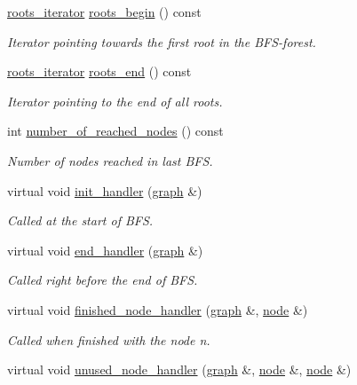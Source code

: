 \begin{DoxyCompactItemize}
\mbox{\hyperlink{classbfs_a70b915179053a2993154614d4358fdc1}{roots\+\_\+iterator}} \mbox{\hyperlink{classbfs_a45d58d06d0dcd6427edad2ec52a6ebb9}{roots\+\_\+begin}} () const
\begin{DoxyCompactList}\small\item\em Iterator pointing towards the first root in the B\+F\+S-\/forest. \end{DoxyCompactList}\item 
\mbox{\hyperlink{classbfs_a70b915179053a2993154614d4358fdc1}{roots\+\_\+iterator}} \mbox{\hyperlink{classbfs_ac84b90f777adeb90390689db62602d73}{roots\+\_\+end}} () const
\begin{DoxyCompactList}\small\item\em Iterator pointing to the end of all roots. \end{DoxyCompactList}\item 
int \mbox{\hyperlink{classbfs_abb971551139ed87e6c78062275301c1b}{number\+\_\+of\+\_\+reached\+\_\+nodes}} () const
\begin{DoxyCompactList}\small\item\em Number of nodes reached in last B\+FS. \end{DoxyCompactList}\item 
virtual void \mbox{\hyperlink{classbfs_a558582dd7a92ce3b3b512c523e589c23}{init\+\_\+handler}} (\mbox{\hyperlink{classgraph}{graph}} \&)
\begin{DoxyCompactList}\small\item\em Called at the start of B\+FS. \end{DoxyCompactList}\item 
virtual void \mbox{\hyperlink{classbfs_adbabb41ab56b92606fe7b53f346142ed}{end\+\_\+handler}} (\mbox{\hyperlink{classgraph}{graph}} \&)
\begin{DoxyCompactList}\small\item\em Called right before the end of B\+FS. \end{DoxyCompactList}\item 
virtual void \mbox{\hyperlink{classbfs_a4d3f1d569910388b2ccece7cedd8bae4}{finished\+\_\+node\+\_\+handler}} (\mbox{\hyperlink{classgraph}{graph}} \&, \mbox{\hyperlink{classnode}{node}} \&)
\begin{DoxyCompactList}\small\item\em Called when finished with the node {\itshape n}. \end{DoxyCompactList}\item 
virtual void \mbox{\hyperlink{classbfs_a6e31b8d063a85d92f2b44ff41d2050aa}{unused\+\_\+node\+\_\+handler}} (\mbox{\hyperlink{classgraph}{graph}} \&, \mbox{\hyperlink{classnode}{node}} \&, \mbox{\hyperlink{classnode}{node}} \&)

\end{DoxyCompactItemize}
